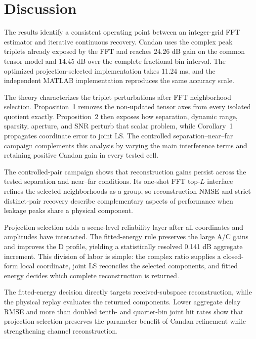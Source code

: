 \section{Discussion}

The results identify a consistent operating point between an integer-grid FFT estimator and iterative continuous recovery. Candan uses the complex peak triplets already exposed by the FFT and reaches 24.26 dB gain on the common tensor model and 14.45 dB over the complete fractional-bin interval. The optimized projection-selected implementation takes 11.24 ms, and the independent MATLAB implementation reproduces the same accuracy scale.

The theory characterizes the triplet perturbations after FFT neighborhood selection. Proposition~1 removes the non-updated tensor axes from every isolated quotient exactly. Proposition~2 then exposes how separation, dynamic range, sparsity, aperture, and SNR perturb that scalar problem, while Corollary~1 propagates coordinate error to joint LS. The controlled separation--near--far campaign complements this analysis by varying the main interference terms and retaining positive Candan gain in every tested cell.

The controlled-pair campaign shows that reconstruction gains persist across the tested separation and near--far conditions. Its one-shot FFT top-$L$ interface refines the selected neighborhoods as a group, so reconstruction NMSE and strict distinct-pair recovery describe complementary aspects of performance when leakage peaks share a physical component.

Projection selection adds a scene-level reliability layer after all coordinates and amplitudes have interacted. The fitted-energy rule preserves the large A/C gains and improves the D profile, yielding a statistically resolved 0.141 dB aggregate increment. This division of labor is simple: the complex ratio supplies a closed-form local coordinate, joint LS reconciles the selected components, and fitted energy decides which complete reconstruction is returned.

The fitted-energy decision directly targets received-subspace reconstruction, while the physical replay evaluates the returned components. Lower aggregate delay RMSE and more than doubled tenth- and quarter-bin joint hit rates show that projection selection preserves the parameter benefit of Candan refinement while strengthening channel reconstruction.
